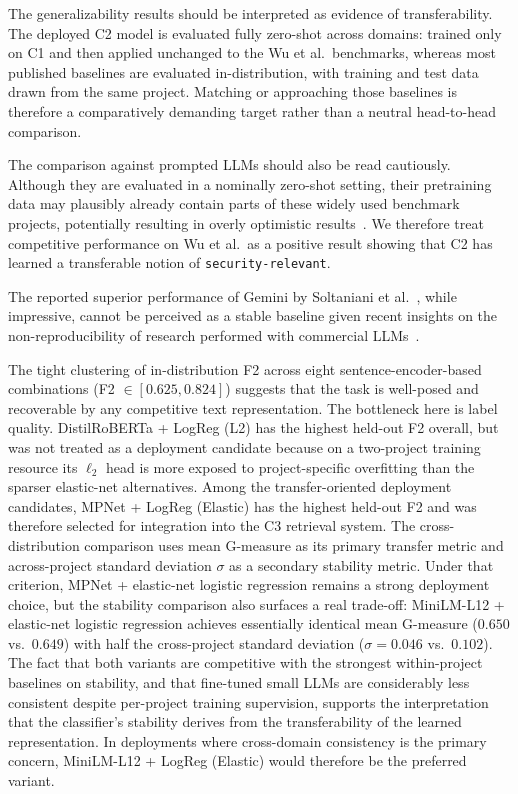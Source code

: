 The generalizability results should be interpreted as evidence of transferability.
The deployed C2 model is evaluated fully zero-shot across domains: trained only on C1 and then applied unchanged to the Wu et al.\ benchmarks, whereas most published baselines are evaluated in-distribution, with training and test data drawn from the same project.
Matching or approaching those baselines is therefore a comparatively demanding target rather than a neutral head-to-head comparison.

The comparison against prompted LLMs should also be read cautiously. Although they are evaluated in a nominally zero-shot setting, their pretraining data may plausibly already contain parts of these widely used benchmark projects, potentially resulting in overly optimistic results~\cite{deng2024llm-contamination, baltes2026guidelinesempiricalstudiessoftware}. We therefore treat competitive performance on Wu et al.\ as a positive result showing that C2 has learned a transferable notion of \texttt{security-relevant}.

The reported superior performance of Gemini by Soltaniani et al.~\cite{soltaniani2026evaluating-llms}, while impressive, cannot be perceived as a stable baseline given recent insights on the non-reproducibility of research performed with commercial LLMs~\cite{angermeirReproducibility}.

The tight clustering of in-distribution F2 across eight sentence-encoder-based combinations (F2 $\in [0.625, 0.824]$) suggests that the task is well-posed and recoverable by any competitive text representation. The bottleneck here is label quality.
DistilRoBERTa + LogReg (L2) has the highest held-out F2 overall, but was not treated as a deployment candidate because on a two-project training resource its $\ell_2$ head is more exposed to project-specific overfitting than the sparser elastic-net alternatives.
Among the transfer-oriented deployment candidates, MPNet + LogReg (Elastic) has the highest held-out F2 and was therefore selected for integration into the C3 retrieval system.
The cross-distribution comparison uses mean G-measure as its primary transfer metric and across-project standard deviation $\sigma$ as a secondary stability metric.
Under that criterion, MPNet + elastic-net logistic regression remains a strong deployment choice, but the stability comparison also surfaces a real trade-off: MiniLM-L12 + elastic-net logistic regression achieves essentially identical mean G-measure ($0.650$ vs.\ $0.649$) with half the cross-project standard deviation ($\sigma = 0.046$ vs.\ $0.102$).
The fact that both variants are competitive with the strongest within-project baselines on stability, and that fine-tuned small LLMs are considerably less consistent despite per-project training supervision, supports the interpretation that the classifier's stability derives from the transferability of the learned representation.
In deployments where cross-domain consistency is the primary concern, MiniLM-L12 + LogReg (Elastic) would therefore be the preferred variant.

